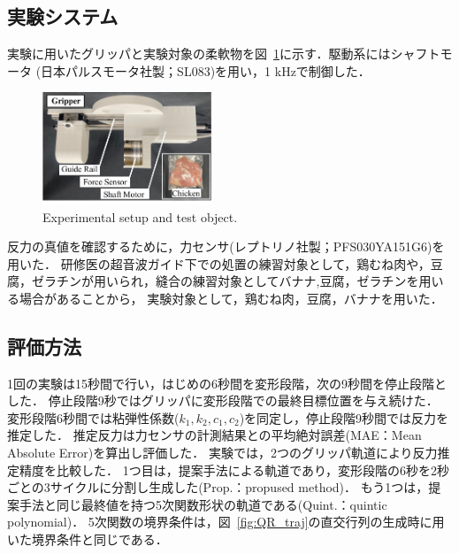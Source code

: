 \documentclass[a4paper]{jarticle}
\begin{document}
\subsection{実験システム}
実験に用いたグリッパと実験対象の柔軟物を図~\ref{fig:exp_setup}に示す．駆動系にはシャフトモータ (日本パルスモータ社製；SL083)を用い，1 kHzで制御した．
\begin{figure}[tb]
    \centering
    \includegraphics[width=0.45\textwidth]{exp_setup_chicken.pdf}
    \caption{Experimental setup and test object.}
    \label{fig:exp_setup}
\end{figure}
反力の真値を確認するために，力センサ(レプトリノ社製；PFS030YA151G6)を用いた．
研修医の超音波ガイド下での処置の練習対象として，鶏むね肉や，豆腐，ゼラチンが用いられ，縫合の練習対象としてバナナ,豆腐，ゼラチンを用いる場合があることから\cite{exp_ref1}\cite{exp_ref2}\cite{exp_ref3}，
実験対象として，鶏むね肉，豆腐，バナナを用いた．
\subsection{評価方法}
1回の実験は15秒間で行い，はじめの6秒間を変形段階，次の9秒間を停止段階とした．
停止段階9秒ではグリッパに変形段階での最終目標位置を与え続けた．
変形段階6秒間では粘弾性係数($k_1, k_2, c_1, c_2$)を同定し，停止段階9秒間では反力を推定した．
推定反力は力センサの計測結果との平均絶対誤差(MAE：Mean Absolute Error)を算出し評価した．
実験では，2つのグリッパ軌道により反力推定精度を比較した．
1つ目は，提案手法による軌道であり，変形段階の6秒を2秒ごとの3サイクルに分割し生成した(Prop.：propused method)．
もう1つは，提案手法と同じ最終値を持つ5次関数形状の軌道である(Quint.：quintic polynomial)．
5次関数の境界条件は，図~{\ref{fig:QR_traj}}の直交行列の生成時に用いた境界条件と同じである．
\end{document}
